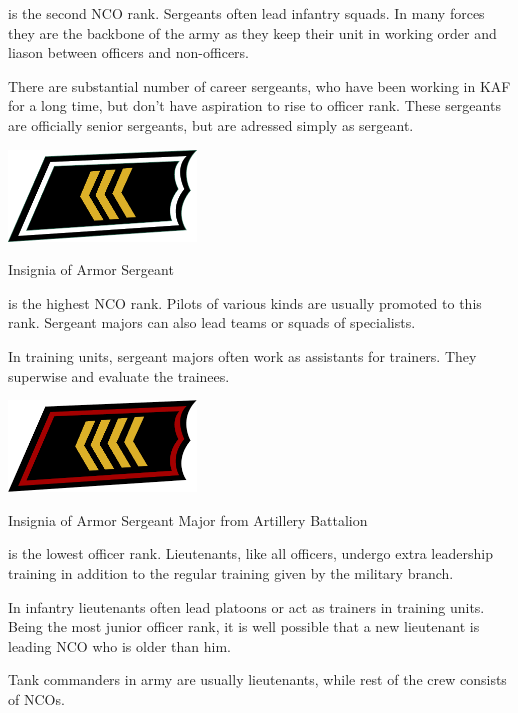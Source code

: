 \documentclass{tufte-book}
\begin{document}
 is the second NCO rank. Sergeants often lead infantry
squads. In many forces they are the backbone of the army as they keep their
unit in working order and liason between officers and non-officers.

There are substantial number of career sergeants, who have been working in
KAF for a long time, but don't have aspiration to rise to officer rank. These
sergeants are officially senior sergeants, but are adressed simply as
sergeant.

\begin{marginfigure}[0\baselineskip]
  \includegraphics[width=5.0cm]{rank-sergeant}
  \caption{Insignia of Armor Sergeant}
  \label{fig:insignia_sergeant}
\end{marginfigure}

 is the highest NCO rank. Pilots of various kinds
are usually promoted to this rank. Sergeant majors can also lead teams or
squads of specialists.

In training units, sergeant majors often work as assistants for trainers.
They superwise and evaluate the trainees.

\begin{marginfigure}[0\baselineskip]
  \includegraphics[width=5.0cm]{rank-sergeant-major}
  \caption{Insignia of Armor Sergeant Major from Artillery Battalion}
  \label{fig:insignia_sergeant_major}
\end{marginfigure}

 is the lowest officer rank. Lieutenants, like all
officers, undergo extra leadership training in addition to the regular
training given by the military branch.

In infantry lieutenants often lead platoons or act as trainers in training
units. Being the most junior officer rank, it is well possible that a
new lieutenant is leading NCO who is older than him.

Tank commanders in army are usually lieutenants, while rest of the crew
consists of NCOs.
\end{document}
